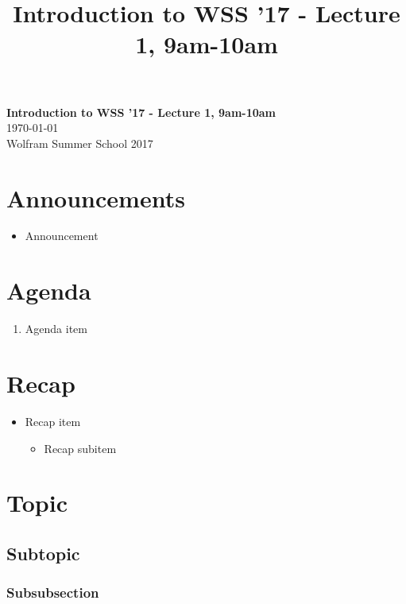 \documentclass[11pt]{article}
\theoremstyle{definition}
\begin{document}
\title{Introduction to WSS '17 - Lecture 1, 9am-10am}

\thispagestyle{empty}
\begin{center}
{\LARGE \bf Introduction to WSS '17 - Lecture 1, 9am-10am}\\
\medskip
{\Large \today}\\
\smallskip
{\large Wolfram Summer School 2017}
\end{center}

\section*{Announcements}
\begin{itemize}
\item Announcement
\end{itemize}

\noindent\hrulefill



\section*{Agenda}
\begin{enumerate}
\item Agenda item
\end{enumerate}

\noindent\hrulefill


\section*{Recap}
\begin{itemize}
\item Recap item
\begin{itemize}
\item Recap subitem
\end{itemize}
\end{itemize}

\noindent\hrulefill


\section{Topic}

\subsection{Subtopic}

\subsubsection{Subsubsection}
\end{document}
